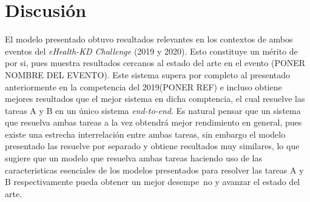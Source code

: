 \section{Discusión}
El modelo presentado obtuvo resultados relevantes en los contextos de ambos eventos del \emph{eHealth-KD Challenge} (2019 y 2020). Esto constituye un m\'erito de por si, pues muestra resultados cercanos al estado del arte en el evento (PONER NOMBRE DEL EVENTO). Este sistema supera por completo al presentado anteriormente en la competencia del 2019(PONER REF) e incluso obtiene mejores resultados que el mejor sistema en dicha comptencia, el cual resuelve las tareas A y B en un \'unico sistema \emph{end-to-end}. Es natural pensar que un sistema que resuelva ambas tareas a la vez obtendr\'a mejor rendimiento en general, pues existe una estrecha interrelaci\'on entre ambas tareas, sin embargo el modelo presentado las resuelve por separado y obtiene resultados muy similares, lo que sugiere que un modelo que resuelva ambas tareas haciendo uso de las caracteristicas esenciales de los modelos presentados para resolver las tareas A y B respectivamente pueda obtener un mejor desempe~no y avanzar el estado del arte.


